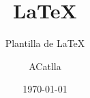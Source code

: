 \documentclass[a4paper,11pt]{scrreprt}
\title{ \LaTeX}
\subtitle{ Plantilla de \LaTeX}
\author{ ACatlla}
\date{ \today}
\begin{document}
\maketitle{}
\tableofcontents{}
\listoffigures{}












\end{document}
